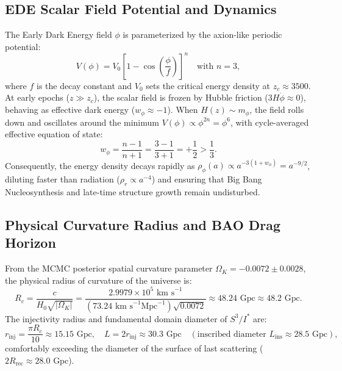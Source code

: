 \documentclass[11pt,a4paper]{article}
\theoremstyle{definition}
\newcommand{\inj}{\mathrm{inj}}
\newcommand{\PDS}{S^3 / I^*}
\begin{document}
\subsection{EDE Scalar Field Potential and Dynamics}
The Early Dark Energy field $\phi$ is parameterized by the axion-like periodic potential:
\begin{equation}
    V(\phi) = V_0 \left[ 1 - \cos\left(\frac{\phi}{f}\right) \right]^n \quad \text{with } n = 3,
\end{equation}
where $f$ is the decay constant and $V_0$ sets the critical energy density at $z_c \approx 3500$. At early epochs ($z \gg z_c$), the scalar field is frozen by Hubble friction ($3 H \dot{\phi} \approx 0$), behaving as effective dark energy ($w_\phi \approx -1$). When $H(z) \sim m_\phi$, the field rolls down and oscillates around the minimum $V(\phi) \propto \phi^{2n} = \phi^6$, with cycle-averaged effective equation of state:
\begin{equation}
    w_\phi = \frac{n - 1}{n + 1} = \frac{3 - 1}{3 + 1} = +\frac{1}{2} > \frac{1}{3}.
\end{equation}
Consequently, the energy density decays rapidly as $\rho_\phi(a) \propto a^{-3(1 + w_\phi)} = a^{-9/2}$, diluting faster than radiation ($\rho_r \propto a^{-4}$) and ensuring that Big Bang Nucleosynthesis and late-time structure growth remain undisturbed.

\subsection{Physical Curvature Radius and BAO Drag Horizon}
From the MCMC posterior spatial curvature parameter $\Omega_K = -0.0072 \pm 0.0028$, the physical radius of curvature of the universe is:
\begin{equation}
    R_c = \frac{c}{H_0 \sqrt{|\Omega_K|}} = \frac{2.9979 \times 10^5\text{ km s}^{-1}}{(73.24\text{ km s}^{-1}\text{Mpc}^{-1})\sqrt{0.0072}} \approx 48.24\text{ Gpc} \approx 48.2\text{ Gpc}.
\end{equation}
The injectivity radius and fundamental domain diameter of $\PDS$ are:
\begin{equation}
    r_{\inj} = \frac{\pi R_c}{10} \approx 15.15\text{ Gpc}, \quad L = 2 r_{\inj} \approx 30.3\text{ Gpc} \quad (\text{inscribed diameter } L_{\mathrm{ins}} \approx 28.5\text{ Gpc}),
\end{equation}
comfortably exceeding the diameter of the surface of last scattering ($2 R_{\mathrm{rec}} \approx 28.0\text{ Gpc}$).
\end{document}
